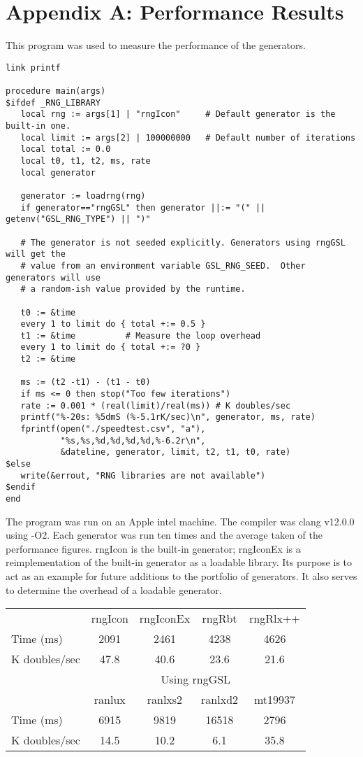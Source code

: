 \documentclass[letterpaper,12pt]{article}
\begin{document}
\section*{Appendix A: Performance Results}
This program was used to measure the performance of the generators.
{\small
\begin{verbatim}
link printf

procedure main(args)
$ifdef _RNG_LIBRARY
   local rng := args[1] | "rngIcon"     # Default generator is the built-in one.
   local limit := args[2] | 100000000   # Default number of iterations
   local total := 0.0
   local t0, t1, t2, ms, rate
   local generator

   generator := loadrng(rng)
   if generator=="rngGSL" then generator ||:= "(" || getenv("GSL_RNG_TYPE") || ")"

   # The generator is not seeded explicitly. Generators using rngGSL will get the
   # value from an environment variable GSL_RNG_SEED.  Other generators will use
   # a random-ish value provided by the runtime.

   t0 := &time
   every 1 to limit do { total +:= 0.5 }
   t1 := &time          # Measure the loop overhead
   every 1 to limit do { total +:= ?0 }
   t2 := &time

   ms := (t2 -t1) - (t1 - t0)
   if ms <= 0 then stop("Too few iterations")
   rate := 0.001 * (real(limit)/real(ms)) # K doubles/sec
   printf("%-20s: %5dmS (%-5.1rK/sec)\n", generator, ms, rate)
   fprintf(open("./speedtest.csv", "a"),
           "%s,%s,%d,%d,%d,%d,%-6.2r\n",
           &dateline, generator, limit, t2, t1, t0, rate)
$else
   write(&errout, "RNG libraries are not available")
$endif
end
\end{verbatim}
}
\newpage\noindent
The program was run on an Apple intel machine. The compiler was clang v12.0.0 using
-O2. Each generator was run ten times and the average taken of the performance figures.
{\sf rngIcon} is the built-in generator; {\sf rngIconEx} is a reimplementation of the
built-in generator as a loadable library.  Its purpose is to act as an example for future
additions to the portfolio of generators. It also serves to determine the overhead of a
loadable generator.

\begin{center}
\begin{tabular}{|lcccc|}
  \hline
  & {\sf rngIcon} & {\sf rngIconEx} & {\sf rngRbt} & {\sf rngRlx++}\\
  Time (ms)    & 2091 & 2461 & 4238 & 4626\\
  K doubles/sec& 47.8 & 40.6 & 23.6 & 21.6\\
  \hline
  & \multicolumn{4}{c|}{Using {\sf rngGSL}}\\
  \hline
  & {\sf ranlux} & {\sf ranlxs2} & {\sf ranlxd2} & {\sf mt19937}\\
  Time (ms)    & 6915 & 9819 & 16518 & 2796\\
  K doubles/sec& 14.5 & 10.2 & 6.1   & 35.8\\
  \hline
\end{tabular}
\end{center}
\end{document}
